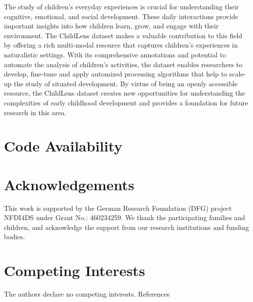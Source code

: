 \documentclass[
  man,floatsintext]{apa6}
\begin{document}
The study of children's everyday experiences is crucial for understanding their cognitive, emotional, and social development. These daily interactions provide important insights into how children learn, grow, and engage with their environment. The ChildLens dataset makes a valuable contribution to this field by offering a rich multi-modal resource that captures children's experiences in naturalistic settings. With its comprehensive annotations and potential to automate the analysis of children's activities, the dataset enables researchers to develop, fine-tune and apply automized processing algorithms that help to scale-up the study of situated development. By virtue of being an openly accessible resource, the ChildLens dataset creates new opportunities for understanding the complexities of early childhood development and provides a foundation for future research in this area.

\section{Code Availability}\label{code-availability}

\section{Acknowledgements}\label{acknowledgements}

This work is supported by the German Research Foundation (DFG) project NFDI4DS under Grant No.: 460234259. We thank the participating families and children, and acknowledge the support from our research institutions and funding bodies.

\section{Competing Interests}\label{competing-interests}

The authors declare no competing interests.
\newpage
References

\begingroup
\setlength{\parindent}{-0.5in}
\setlength{\leftskip}{0.5in}
\end{document}
